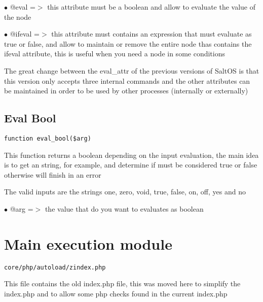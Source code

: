 \documentclass[a4paper]{book}
\begin{document}
\begin{compactitem}
\item[\color{myblue}$\bullet$] @eval =$>$ this attribute must be a boolean and allow to evaluate the value
of the node
\end{compactitem}

\begin{compactitem}
\item[\color{myblue}$\bullet$] @ifeval =$>$ this attribute must contains an expression that must evaluate as
true or false, and allow to maintain or remove the entire node thas contains
the ifeval attribute, this is useful when you need a node in some conditions
\end{compactitem}

The great change between the eval\_attr of the previous versions of SaltOS is
that this version only accepts three internal commands and the other
attributes can be maintained in order to be used by other processes
(internally or externally)

\hypertarget{toc288}{}
\subsection{Eval Bool}

\begin{lstlisting}
function eval_bool($arg)
\end{lstlisting}

This function returns a boolean depending on the input evaluation, the main idea
is to get an string, for example, and determine if must be considered true or false
otherwise will finish in an error

The valid inputs are the strings one, zero, void, true, false, on, off, yes and no

\begin{compactitem}
\item[\color{myblue}$\bullet$] @arg =$>$ the value that do you want to evaluates as boolean
\end{compactitem}

\hypertarget{toc289}{}
\section{Main execution module}

\begin{lstlisting}
core/php/autoload/zindex.php
\end{lstlisting}

This file contains the old index.php file, this was moved here to simplify the index.php and to
allow some php checks found in the current index.php
\end{document}
